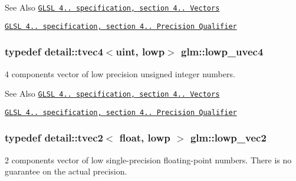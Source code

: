 \begin{DoxySeeAlso}{See Also}
\href{http://www.opengl.org/registry/doc/GLSLangSpec.4.20.8.pdf}{\tt G\-L\-S\-L 4.. specification, section 4.. Vectors} 

\href{http://www.opengl.org/registry/doc/GLSLangSpec.4.20.8.pdf}{\tt G\-L\-S\-L 4.. specification, section 4.. Precision Qualifier} 
\end{DoxySeeAlso}
\hypertarget{group__core__precision_ga17b5f652e5c64b0034065420d844fca7}{
\subsubsection[{lowp\-\_\-uvec4}]{\setlength{\rightskip}{0pt plus 5cm}typedef detail\-::tvec4$<$uint, lowp$>$ {\bf glm\-::lowp\-\_\-uvec4}}}\label{group__core__precision_ga17b5f652e5c64b0034065420d844fca7}
4 components vector of low precision unsigned integer numbers.

\begin{DoxySeeAlso}{See Also}
\href{http://www.opengl.org/registry/doc/GLSLangSpec.4.20.8.pdf}{\tt G\-L\-S\-L 4.. specification, section 4.. Vectors} 

\href{http://www.opengl.org/registry/doc/GLSLangSpec.4.20.8.pdf}{\tt G\-L\-S\-L 4.. specification, section 4.. Precision Qualifier} 
\end{DoxySeeAlso}
\hypertarget{group__core__precision_gac63d79532b7e8d18f579ebe63e4fde49}{
\subsubsection[{lowp\-\_\-vec2}]{\setlength{\rightskip}{0pt plus 5cm}typedef detail\-::tvec2$<$ float, lowp $>$ {\bf glm\-::lowp\-\_\-vec2}}}\label{group__core__precision_gac63d79532b7e8d18f579ebe63e4fde49}
2 components vector of low single-\/precision floating-\/point numbers. There is no guarantee on the actual precision.

